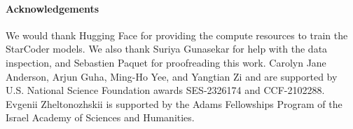 \paragraph{Acknowledgements} We would thank Hugging Face for providing the compute resources to train the StarCoder models.  We also thank Suriya Gunasekar for help with the data inspection, and Sebastien Paquet for proofreading this work. Carolyn Jane Anderson, Arjun Guha, Ming-Ho Yee, and Yangtian Zi and  are supported by U.S. National Science Foundation awards SES-2326174 and CCF-2102288. Evgenii Zheltonozhskii is supported by the Adams Fellowships Program of the Israel Academy of Sciences and Humanities.


